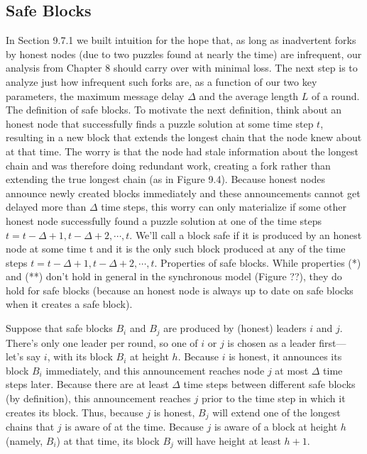 \subsection{Safe Blocks}
In Section 9.7.1 we built intuition for the hope that, as long as inadvertent forks by honest nodes
(due to two puzzles found at nearly the time) are infrequent, our analysis from Chapter 8
should carry over with minimal loss. The next step is to analyze just how infrequent such
forks are, as a function of our two key parameters, the maximum message delay $\Delta$ and the
average length $L$ of a round.
The definition of safe blocks. To motivate the next definition, think about an honest
node that successfully finds a puzzle solution at some time step $t$, resulting in a new block
that extends the longest chain that the node knew about at that time. The worry is that
the node had stale information about the longest chain and was therefore doing redundant
work, creating a fork rather than extending the true longest chain (as in Figure 9.4). Because
honest nodes announce newly created blocks immediately and these announcements cannot
get delayed more than $\Delta$ time steps, this worry can only materialize if some other honest
node successfully found a puzzle solution at one of the time steps $t = t-\Delta+1, t-\Delta+2, \cdots, t$.
We’ll call a block safe if it is produced by an honest node at some time t and it
is the only such block produced at any of the time steps $t = t - \Delta + 1, t - \Delta + 2, \cdots, t$.
Properties of safe blocks. While properties (*) and (**) don’t hold in general in the
synchronous model (Figure ??), they do hold for safe blocks (because an honest node is
always up to date on safe blocks when it creates a safe block).\\

\begin{myproof}
Suppose that safe blocks $B_i$ and $B_j$ are produced by (honest) leaders $i$ and $j$. There’s
only one leader per round, so one of $i$ or $j$ is chosen as a leader first—let’s say $i$, with its
block $B_i$ at height $h$. Because $i$ is honest, it announces its block $B_i$
immediately, and this
announcement reaches node $j$ at most $\Delta$ time steps later. Because there are at least $\Delta$ time
steps between different safe blocks (by definition), this announcement reaches $j$ prior to the
time step in which it creates its block. Thus, because $j$ is honest, $B_j$ will extend one of
the longest chains that $j$ is aware of at the time. Because $j$ is aware of a block at height $h$
(namely, $B_i$) at that time, its block $B_j$ will have height at least $h + 1$. 
\end{myproof}

